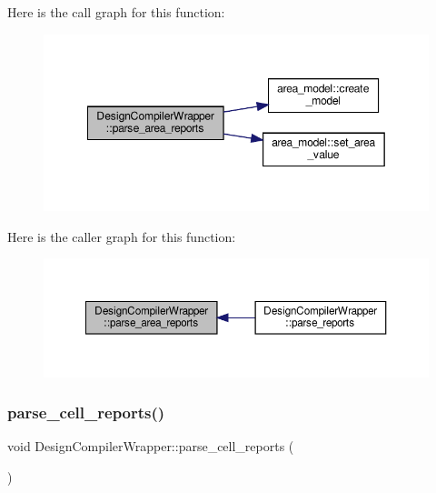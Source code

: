 Here is the call graph for this function\+:
\nopagebreak
\begin{figure}[H]
\begin{center}
\leavevmode
\includegraphics[width=349pt]{d5/d55/classDesignCompilerWrapper_a6fa8c9faab67d5c8d627562108c1c34d_cgraph}
\end{center}
\end{figure}
Here is the caller graph for this function\+:
\nopagebreak
\begin{figure}[H]
\begin{center}
\leavevmode
\includegraphics[width=350pt]{d5/d55/classDesignCompilerWrapper_a6fa8c9faab67d5c8d627562108c1c34d_icgraph}
\end{center}
\end{figure}
\mbox{\label{classDesignCompilerWrapper_a02ce587a350321c1d587beb1fd3810af}} 
\subsubsection{\texorpdfstring{parse\+\_\+cell\+\_\+reports()}{parse\_cell\_reports()}}
{\footnotesize\ttfamily void Design\+Compiler\+Wrapper\+::parse\+\_\+cell\+\_\+reports (\begin{DoxyParamCaption}{ }\end{DoxyParamCaption})\hspace{0.3cm}{\ttfamily [protected]}}



